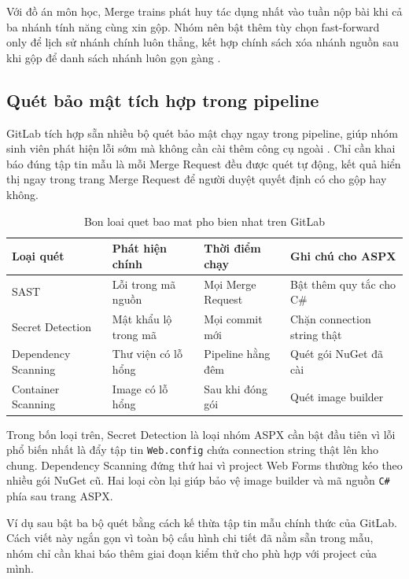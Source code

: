 Với đồ án môn học, Merge trains phát huy tác dụng nhất vào tuần nộp bài khi cả ba nhánh tính năng cùng xin gộp. Nhóm nên bật thêm tùy chọn fast-forward only để lịch sử nhánh chính luôn thẳng, kết hợp chính sách xóa nhánh nguồn sau khi gộp để danh sách nhánh luôn gọn gàng \cite{gitflow}.

\subsection{Quét bảo mật tích hợp trong pipeline}

GitLab tích hợp sẵn nhiều bộ quét bảo mật chạy ngay trong pipeline, giúp nhóm sinh viên phát hiện lỗi sớm mà không cần cài thêm công cụ ngoài \cite{gitlabci}. Chỉ cần khai báo đúng tập tin mẫu là mỗi Merge Request đều được quét tự động, kết quả hiển thị ngay trong trang Merge Request để người duyệt quyết định có cho gộp hay không.

\begin{table}[H]
\centering
\caption{Bon loai quet bao mat pho bien nhat tren GitLab}
\label{tab:c53-scan}
\begin{tabular}{llll}
\toprule
Loại quét & Phát hiện chính & Thời điểm chạy & Ghi chú cho ASPX \\
\midrule
SAST & Lỗi trong mã nguồn & Mọi Merge Request & Bật thêm quy tắc cho C\# \\
Secret Detection & Mật khẩu lộ trong mã & Mọi commit mới & Chặn connection string thật \\
Dependency Scanning & Thư viện có lỗ hổng & Pipeline hằng đêm & Quét gói NuGet đã cài \\
Container Scanning & Image có lỗ hổng & Sau khi đóng gói & Quét image builder \\
\bottomrule
\end{tabular}
\end{table}

Trong bốn loại trên, Secret Detection là loại nhóm ASPX cần bật đầu tiên vì lỗi phổ biến nhất là đẩy tập tin \verb|Web.config| chứa connection string thật lên kho chung. Dependency Scanning đứng thứ hai vì project Web Forms thường kéo theo nhiều gói NuGet cũ. Hai loại còn lại giúp bảo vệ image builder và mã nguồn \verb|C#| phía sau trang ASPX.

Ví dụ sau bật ba bộ quét bằng cách kế thừa tập tin mẫu chính thức của GitLab. Cách viết này ngắn gọn vì toàn bộ cấu hình chi tiết đã nằm sẵn trong mẫu, nhóm chỉ cần khai báo thêm giai đoạn kiểm thử cho phù hợp với project của mình.


